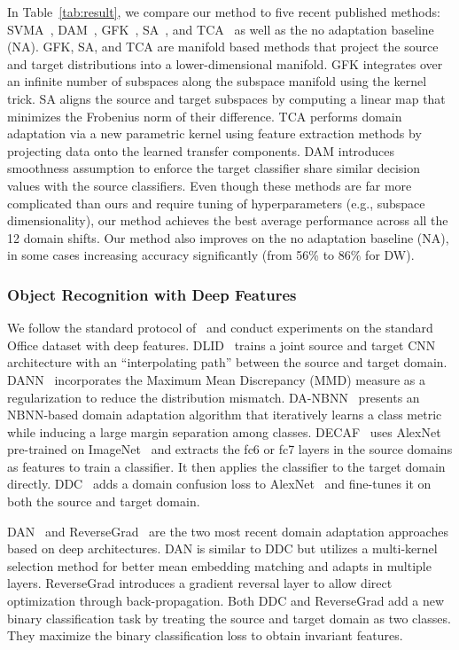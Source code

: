 \documentclass[letterpaper]{article}
\begin{document}
In Table~\ref{tab:result}, we compare our method to five recent published methods: SVMA~\cite{svma}, DAM~\cite{ref:duan09}, GFK~\cite{gfk}, SA~\cite{sasb}, and TCA~\cite{tca} as well as the no adaptation baseline (NA). GFK, SA, and TCA are manifold based methods that project the source and target distributions into a lower-dimensional manifold. GFK integrates over an infinite number of subspaces along the subspace manifold using the kernel trick. SA aligns the source and target subspaces by computing a linear map that minimizes the Frobenius norm of their difference. TCA performs domain adaptation via a new parametric kernel using feature extraction methods by projecting data onto the learned transfer components. DAM introduces smoothness assumption to enforce the target classifier share similar decision values with the source classifiers. Even though these methods are far more complicated than ours and require tuning of hyperparameters (e.g., subspace dimensionality), our method achieves the best average performance across all the 12 domain shifts. Our method also improves on the no adaptation baseline (NA), in some cases increasing accuracy significantly (from 56\% to 86\% for DW). 

\subsubsection{Object Recognition with Deep Features}  
We follow the standard protocol of~\cite{decaf,tzeng_arxiv15,dan_long15,reversegrad} and conduct experiments on the standard Office dataset with deep features. DLID~\cite{chopra2013dlid} trains a joint source and target CNN architecture with an ``interpolating path'' between the source and target domain. DANN~\cite{DANN} incorporates the Maximum Mean Discrepancy (MMD) measure as a regularization to reduce the distribution mismatch. DA-NBNN~\cite{da_nbnn} presents an NBNN-based domain adaptation algorithm that  iteratively learns a class metric while inducing a large margin separation among classes. DECAF~\cite{decaf} uses  AlexNet~\cite{alexnet} pre-trained on ImageNet~\cite{imagenet} and extracts the fc6 or fc7 layers in the source domains as features to train a classifier. It then applies the classifier to the target domain directly. DDC~\cite{tzeng_arxiv15} adds a domain confusion loss to AlexNet~\cite{alexnet} and fine-tunes it on both the source and target domain.  

DAN~\cite{dan_long15} and ReverseGrad~\cite{reversegrad} are the two most recent domain adaptation approaches based on deep architectures. DAN is similar to DDC but utilizes a multi-kernel selection method for better mean embedding matching and adapts in multiple layers. ReverseGrad introduces a gradient reversal layer to allow direct optimization through back-propagation. Both DDC and ReverseGrad add a new binary classification task by treating the source and target domain as two classes. They maximize the binary classification loss to obtain invariant features. 
\end{document}
